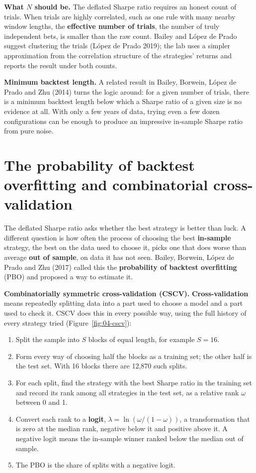 \textbf{What $N$ should be.} The deflated Sharpe ratio requires an honest count of trials. When trials are highly correlated, such as one rule with many nearby window lengths, the \textbf{effective number of trials}, the number of truly independent bets, is smaller than the raw count. Bailey and L\'opez de Prado suggest clustering the trials (L\'opez de Prado 2019); the lab uses a simpler approximation from the correlation structure of the strategies' returns and reports the result under both counts.

\textbf{Minimum backtest length.} A related result in Bailey, Borwein, L\'opez de Prado and Zhu (2014) turns the logic around: for a given number of trials, there is a minimum backtest length below which a Sharpe ratio of a given size is no evidence at all. With only a few years of data, trying even a few dozen configurations can be enough to produce an impressive in-sample Sharpe ratio from pure noise.

\section{The probability of backtest overfitting and combinatorial cross-validation}
\label{sec:04-pbo}

The deflated Sharpe ratio asks whether the best strategy is better than luck. A different question is how often the process of choosing the best \textbf{in-sample} strategy, the best on the data used to choose it, picks one that does worse than average \textbf{out of sample}, on data it has not seen. Bailey, Borwein, L\'opez de Prado and Zhu (2017) called this the \textbf{probability of backtest overfitting} (PBO) and proposed a way to estimate it.

\textbf{Combinatorially symmetric cross-validation (CSCV).} \textbf{Cross-validation} means repeatedly splitting data into a part used to choose a model and a part used to check it. CSCV does this in every possible way, using the full history of every strategy tried (Figure~\ref{fig:04-cscv}):

\begin{enumerate}
  \item Split the sample into $S$ blocks of equal length, for example $S = 16$.
  \item Form every way of choosing half the blocks as a training set; the other half is the test set. With 16 blocks there are 12,870 such splits.
  \item For each split, find the strategy with the best Sharpe ratio in the training set and record its rank among all strategies in the test set, as a relative rank $\omega$ between 0 and 1.
  \item Convert each rank to a \textbf{logit}, $\lambda = \ln(\omega / (1 - \omega))$, a transformation that is zero at the median rank, negative below it and positive above it. A negative logit means the in-sample winner ranked below the median out of sample.
  \item The PBO is the share of splits with a negative logit.
\end{enumerate}

